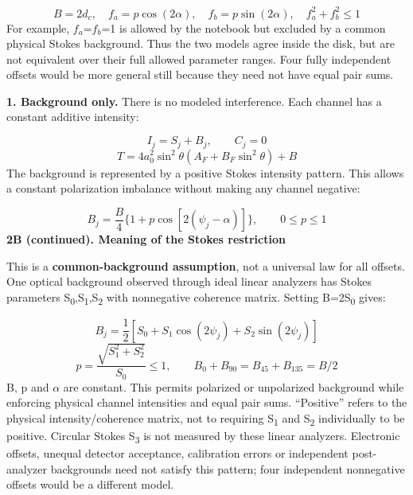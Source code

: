 \documentclass[10pt,a4paper]{article}
\newcommand{\heading}[1]{{\sffamily\Large\bfseries\color{ink}#1}\par\vspace{7pt}}
\begin{document}
\begin{equation*}B=2d_c,\quad f_a=p\cos(2\alpha),\quad f_b=p\sin(2\alpha),\quad f_a^2+f_b^2\leq1\end{equation*}
For example, \(f_{a}\)=\(f_{b}\)=1 is allowed by the notebook but excluded by a common physical Stokes background. Thus the two models agree inside the disk, but are not equivalent over their full allowed parameter ranges. Four fully independent offsets would be more general still because they need not have equal pair sums.\par
\textbf{1. Background only.} There is no modeled interference. Each channel has a constant additive intensity:\par
\begin{equation*}I_j=S_j+B_j,\qquad C_j=0\end{equation*}
\begin{equation*}T=4a_0^2\sin^2\theta(A_F+B_F\sin^2\theta)+B\end{equation*}
The background is represented by a positive Stokes intensity pattern. This allows a constant polarization imbalance without making any channel negative:\par
\begin{equation*}B_j=\frac{B}{4}\{1+p\cos[2(\psi_j-\alpha)]\},\qquad 0\leq p\leq1\end{equation*}
\clearpage
\heading{2B (continued). Meaning of the Stokes restriction}
This is a \textbf{common-background assumption}, not a universal law for all offsets. One optical background observed through ideal linear analyzers has Stokes parameters S\textsubscript{0},S\textsubscript{1},S\textsubscript{2} with nonnegative coherence matrix. Setting B=2S\textsubscript{0} gives:\par
\begin{equation*}B_j=\frac12\left[S_0+S_1\cos(2\psi_j)+S_2\sin(2\psi_j)\right]\end{equation*}
\begin{equation*}p=\frac{\sqrt{S_1^2+S_2^2}}{S_0}\leq1,\qquad B_0+B_{90}=B_{45}+B_{135}=B/2\end{equation*}
B, p and \(α\) are constant. This permits polarized or unpolarized background while enforcing physical channel intensities and equal pair sums. “Positive” refers to the physical intensity/coherence matrix, not to requiring S\textsubscript{1} and S\textsubscript{2} individually to be positive. Circular Stokes S\textsubscript{3} is not measured by these linear analyzers. Electronic offsets, unequal detector acceptance, calibration errors or independent post-analyzer backgrounds need not satisfy this pattern; four independent nonnegative offsets would be a different model.\par
\end{document}
